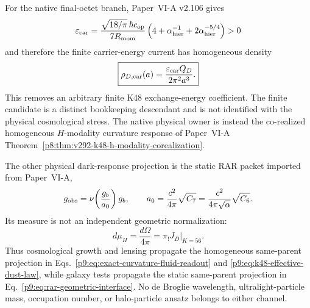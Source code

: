 \documentclass[12pt,a4paper]{article}
\begin{document}
\begin{corollary}
\label{p9:cor:v179-native-k48-finite-energy-candidate}
For the native final-octet branch, Paper~VI-A v2.106 gives
\[
 \varepsilon_{\rm car}
 =\frac{\sqrt{18/\pi}\,\hbar c_{\rm op}}{7R_{\rm mom}}
 \left(4+\alpha_{\rm hier}^{-1}
 +2\alpha_{\rm hier}^{-5/4}\right)>0
\]
and therefore the finite carrier-energy current has homogeneous density
\[
 \boxed{\rho_{D,\rm car}(a)
 =\frac{\varepsilon_{\rm car}Q_D}{2\pi^2a^3}.}
\]
This removes an arbitrary finite K48 exchange-energy coefficient.  The finite
candidate is a distinct bookkeeping descendant and is not identified with the
physical cosmological stress.  The native physical owner is instead the
co-realized homogeneous $H$-modality curvature response of Paper~VI-A
Theorem~\ref{p8:thm:v292-k48-h-modality-corealization}.
\end{corollary}

The other physical dark-response projection is the static RAR packet imported
from Paper~VI-A,
\begin{equation}
\label{p9:eq:rar-geometric-interface}
g_{\rm obs}=\nu\!\left(\frac{g_b}{a_0}\right)g_b,
\qquad
a_0=\frac{c^2}{4\pi}\sqrt{C_7}
=\frac{c^2}{4\pi\sqrt\alpha}\sqrt{C_6}.
\end{equation}
Its measure is not an independent geometric normalization:
\begin{equation}
 \label{p9:eq:rar-terminal-parent-measure}
 \boxed{d\mu_H=\frac{d\Omega}{4\pi}
 =\left.\pi_!J_D\right|_{K=56}}.
\end{equation}
Thus cosmological growth and lensing propagate the homogeneous same-parent
projection in Eqs.~\eqref{p9:eq:exact-curvature-fluid-readout} and
\eqref{p9:eq:k48-effective-dust-law}, while galaxy tests propagate the
static same-parent projection in Eq.~\eqref{p9:eq:rar-geometric-interface}.  No de Broglie wavelength,
ultralight-particle mass, occupation number, or halo-particle ansatz belongs
to either channel.



\end{document}
